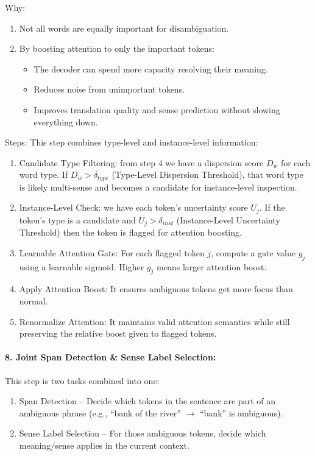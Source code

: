 \documentclass[a4paper,12pt]{article}
\begin{document}
Why:
\begin{enumerate}
    \item Not all words are equally important for disambiguation.
    \item By boosting attention to only the important tokens:
    \begin{itemize}
        \item The decoder can spend more capacity resolving their meaning.
        \item Reduces noise from unimportant tokens.
        \item Improves translation quality and sense prediction without slowing everything down.
    \end{itemize}
\end{enumerate}

Steps: This step combines type-level and instance-level information:
\begin{enumerate}
    \item Candidate Type Filtering: from step 4 we have a dispersion score $D_w$ for each word type. If $D_w > \delta_{type}$ (Type-Level Dispersion Threshold), that word type is likely multi-sense and becomes a candidate for instance-level inspection.
    \item Instance-Level Check: we have each token’s uncertainty score $U_j$. If the token’s type is a candidate and $U_j > \delta_{inst}$ (Instance-Level Uncertainty Threshold) then the token is flagged for attention boosting.
    \item Learnable Attention Gate: For each flagged token $j$, compute a gate value $g_j$ using a learnable sigmoid. Higher $g_j$ means larger attention boost.
    \item Apply Attention Boost: It ensures ambiguous tokens get more focus than normal.
    \item Renormalize Attention: It maintains valid attention semantics while still preserving the relative boost given to flagged tokens.
\end{enumerate}

\paragraph{8. Joint Span Detection \& Sense Label Selection:}
This step is two tasks combined into one:
\begin{enumerate}
    \item Span Detection – Decide which tokens in the sentence are part of an ambiguous phrase (e.g., ``bank of the river'' $\rightarrow$ ``bank'' is ambiguous).
    \item Sense Label Selection – For those ambiguous tokens, decide which meaning/sense applies in the current context.
\end{enumerate}
\end{document}
